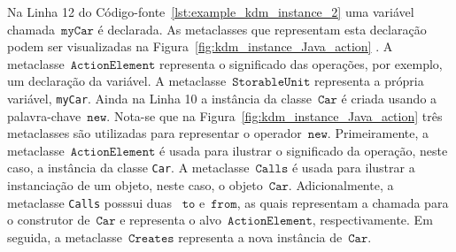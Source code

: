 
Na Linha 12 do Código-fonte~\ref{lst:example_kdm_instance_2}  uma variável chamada~$\mathtt{myCar}$ é declarada. As metaclasses que representam esta declaração podem ser visualizadas na Figura~\ref{fig:kdm_instance_Java_action} . A metaclasse~$\mathtt{ActionElement}$ representa o significado das operações, por exemplo, um declaração da variável. A metaclasse~$\mathtt{StorableUnit}$ representa a própria variável, \texttt{myCar}. Ainda na Linha 10  a instância da classe~$\mathtt{Car}$ é criada usando a palavra-chave~$\mathtt{new}$. Nota-se que na Figura~\ref{fig:kdm_instance_Java_action}  três metaclasses são utilizadas para representar o operador~$\mathtt{new}$. Primeiramente, a metaclasse~$\mathtt{ActionElement}$ é usada para ilustrar o significado da operação, neste caso, a instância da classe \texttt{Car}. A metaclasse~$\mathtt{Calls}$ é usada para ilustrar a instanciação de um objeto, neste caso, o objeto~$\mathtt{Car}$. Adicionalmente, a metaclasse \texttt{Calls} posssui duas ~$\mathtt{to}$ e~$\mathtt{from}$, as quais representam a chamada para o construtor de~$\mathtt{Car}$ e representa o alvo~$\mathtt{ActionElement}$, respectivamente. Em seguida, a metaclasse~$\mathtt{Creates}$ representa a nova instância de~$\mathtt{Car}$.

